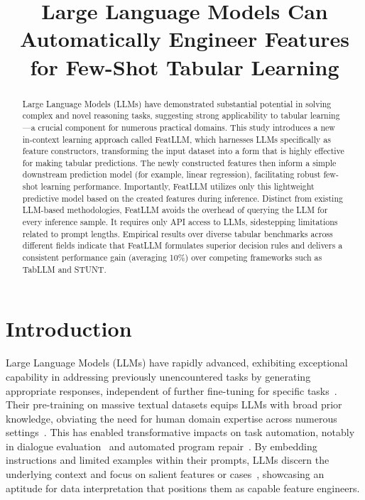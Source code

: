 \title{Large Language Models Can Automatically Engineer Features for Few-Shot Tabular Learning}

\begin{abstract}
Large Language Models (LLMs) have demonstrated substantial potential in solving complex and novel reasoning tasks, suggesting strong applicability to tabular learning—a crucial component for numerous practical domains. This study introduces a new in-context learning approach called \textsf{FeatLLM}, which harnesses LLMs specifically as feature constructors, transforming the input dataset into a form that is highly effective for making tabular predictions. The newly constructed features then inform a simple downstream prediction model (for example, linear regression), facilitating robust few-shot learning performance. Importantly, \textsf{FeatLLM} utilizes only this lightweight predictive model based on the created features during inference. Distinct from existing LLM-based methodologies, \textsf{FeatLLM} avoids the overhead of querying the LLM for every inference sample. It requires only API access to LLMs, sidestepping limitations related to prompt lengths. Empirical results over diverse tabular benchmarks across different fields indicate that \textsf{FeatLLM} formulates superior decision rules and delivers a consistent performance gain (averaging 10\%) over competing frameworks such as TabLLM and STUNT.
\end{abstract}

\section{Introduction}
Large Language Models (LLMs) have rapidly advanced, exhibiting exceptional capability in addressing previously unencountered tasks by generating appropriate responses, independent of further fine-tuning for specific tasks~\cite{creswell2022selection,imani2023mathprompter,taylor2022galactica}. Their pre-training on massive textual datasets equips LLMs with broad prior knowledge, obviating the need for human domain expertise across numerous settings~\cite{Genomes2021,singhal2023large,wilcox2003role}. This has enabled transformative impacts on task automation, notably in dialogue evaluation~\cite{finch2023leveraging} and automated program repair~\cite{fan2023automated}. By embedding instructions and limited examples within their prompts, LLMs discern the underlying context and focus on salient features or cases~\cite{brown2020language,zhao2023survey}, showcasing an aptitude for data interpretation that positions them as capable feature engineers.

